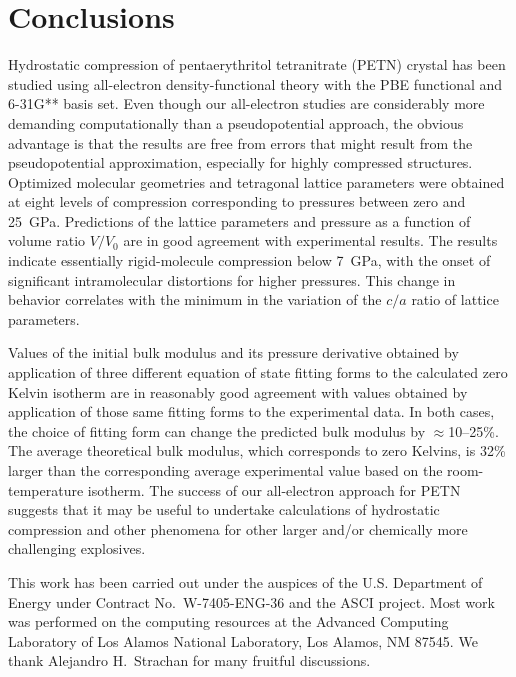 \documentclass[prb,aps,nobibnotes,twocolumn,doublespace,twocolumngrid,superbib]{revtex4}
\begin{document}
\section{Conclusions}
\label{sec:conclusions}
Hydrostatic compression of pentaerythritol tetranitrate (PETN) crystal
has been studied using all-electron density-functional theory with the
PBE functional and 6-31G** basis set. Even though our all-electron
studies are considerably more demanding computationally than a
pseudopotential approach, the obvious advantage is that the results
are free from errors that might result from the pseudopotential
approximation, especially for highly compressed structures.  Optimized
molecular geometries and tetragonal lattice parameters were obtained
at eight levels of compression corresponding to pressures between zero
and 25~GPa.  Predictions of the lattice parameters and pressure as a
function of volume ratio $V/V_0$ are in good agreement with
experimental results. The results indicate essentially rigid-molecule
compression below 7~GPa, with the onset of significant intramolecular
distortions for higher pressures.  This change in behavior correlates
with the minimum in the variation of the $c/a$ ratio of lattice
parameters.

Values of the initial bulk modulus and its pressure derivative
obtained by application of three different equation of state fitting
forms to the calculated zero Kelvin isotherm are in reasonably good
agreement with values obtained by application of those same fitting
forms to the experimental data.  In both cases, the choice of fitting
form can change the predicted bulk modulus by $\approx$10--25\%.  The
average theoretical bulk modulus, which corresponds to zero Kelvins,
is 32\% larger than the corresponding average experimental value based
on the room-temperature isotherm.  The success of our all-electron
approach for PETN suggests that it may be useful to undertake
calculations of hydrostatic compression and other phenomena for other
larger and/or chemically more challenging explosives.

\begin{acknowledgments}
This work has been carried out under the auspices of the
U.S. Department of Energy under Contract No.~W-7405-ENG-36 and the
ASCI project.  Most work was performed on the computing resources at
the Advanced Computing Laboratory of Los Alamos National Laboratory,
Los Alamos, NM 87545.  We thank Alejandro H.~Strachan for many
fruitful discussions.
\end{acknowledgments}
\end{document}
